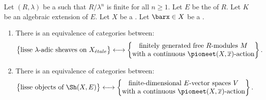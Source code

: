 \begin{theorem} \label{theorem:lisse_ell_adic_sheaves_on_connected_noetherian_schemes_are_equivalent_to_representations_of_etale_fundamental_group_over_adic_ring}
    Let $(R, \lambda)$ be a   such that $R/\lambda^n$ is finite for all $n \geq 1$. Let $E$ be the  of $R$. Let $K$ be an algebraic extension of $E$. Let $X$ be a  . Let $\barx \in X$ be a .

    \begin{enumerate}
        \item There is an equivalence of categories between:
        \[
        \left\{
        \begin{matrix}
            \text{lisse } \lambda\text{-adic sheaves on } X_{\acute{e}tale}
        \end{matrix}
        \right\}
        \longleftrightarrow
        \left\{
        \begin{matrix}
            \text{finitely generated free } R\text{-modules } M \\
            \text{with a continuous } \pioneet(X, \overline{x})\text{-action}
        \end{matrix}
        \right\}.
        \]

        \item There is an equivalence of categories between:
        \[
        \left\{
        \begin{matrix}
            \text{lisse objects of } \Sh(X, E)
        \end{matrix}
        \right\}
        \longleftrightarrow
        \left\{
        \begin{matrix}
            \text{finite-dimensional } E\text{-vector spaces } V \\
            \text{with a continuous } \pioneet(X, \overline{x})\text{-action}
        \end{matrix}
        \right\}.
        \]


\end{enumerate}
\end{theorem}
